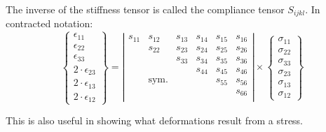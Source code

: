 \documentclass[a4paper,landscape,oneside,11pt,twocolumn]{memoir}
\begin{document}
The inverse of the stiffness tensor is called the compliance tensor
$S_{ijkl}$.
In contracted notation:
\[
  \left\{\begin{array}{c}
            \epsilon_{11}\\[2pt] \epsilon_{22}\\[2pt] \epsilon_{33}\\[2pt]
            2\cdot\epsilon_{23}\\[2pt] 2\cdot\epsilon_{13}\\[2pt] 2\cdot\epsilon_{12}
        \end{array}\right\} =
     \left|\begin{array}{cccccc}
        s_{11} & s_{12} & s_{13} & s_{14} & s_{15} & s_{16}\\
               & s_{22} & s_{23} & s_{24} & s_{25} & s_{26}\\
               &        & s_{33} & s_{34} & s_{35} & s_{36}\\
               &        &        & s_{44} & s_{45} & s_{46}\\
               &  \mathrm{sym.}  &        &        & s_{55} & s_{56}\\
               &        &        &        &        & s_{66}\\
    \end{array}\right|
    \times
        \left\{\begin{array}{c}
          \sigma_{11}\\ \sigma_{22}\\ \sigma_{33}\\ \sigma_{23}\\ \sigma_{13}\\ \sigma_{12}
          \end{array}\right\}
\]

This is also useful in showing what deformations result from a stress.
\end{document}
